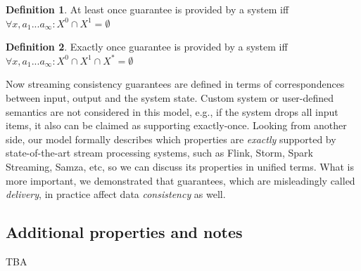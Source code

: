 \documentclass[sigconf]{acmart}
\theoremstyle{definition}
\newtheorem{definition}{Definition}
\begin{document}
\begin{definition}{At least once}
guarantee is provided by a system iff $\forall{x,a_1...a_\infty}:X^{0}\cap{X^{1}}=\emptyset$
\end{definition}

\begin{definition}{Exactly once}
guarantee is provided by a system iff $\forall{x,a_1...a_\infty}:X^{0}\cap{X^{1}}\cap{X^{*}}=\emptyset$
\end{definition}

Now streaming consistency guarantees are defined in terms of correspondences between input, output and the system state. Custom system or user-defined semantics are not considered in this model, e.g., if the system drops all input items, it also can be claimed as supporting exactly-once. Looking from another side, our model formally describes which properties are {\em exactly} supported by state-of-the-art stream processing systems, such as Flink, Storm, Spark Streaming, Samza, etc, so we can discuss its properties in unified terms. What is more important, we demonstrated that guarantees, which are misleadingly called {\em delivery}, in practice affect data {\em consistency} as well.

\subsection{Additional properties and notes}
 
 TBA



\end{document}
